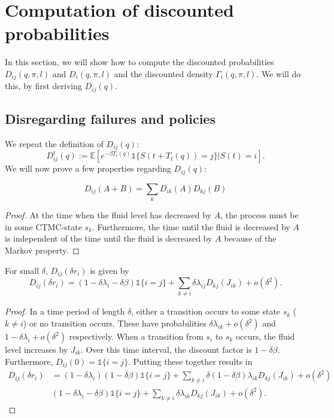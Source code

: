 \section{Computation of discounted probabilities}
In this section, we will show how to compute the discounted probabilities $D_{ij}(q,\pi,l)$ and $D_{i}(q,\pi,l)$ and the discounted density $\Gamma_i(q,\pi,l)$.
We will do this, by first deriving $D_{ij}(q)$.

\subsection{Disregarding failures and policies}
We repeat the definition of $D_{ij}(q)$:
\[
D_{ij}^t(q):=\mathbb{E}[e^{-\beta T_t(q)}\mathds{1}\{S(t+T_t(q))=j\}|S(t)=i].
\]
We will now prove a few properties regarding $D_{ij}(q)$:
\begin{lemma}\label{lemma:MmfmDiscountsExponentLinear}
	\[
	D_{ij}(A+B)=\sum\limits_k D_{ik}(A)D_{kj}(B)
	\]
	\begin{proof}
		At the time when the fluid level has decreased by $A$, the process must be in some CTMC-state $s_k$.
		Furthermore, the time until the fluid is decreased by $A$ is independent of the time until the fluid is decreased by $A$ because of the Markov property.
	\end{proof}
\end{lemma}
\begin{lemma}\label{lemma:MmfmDiscountsInfinitisimal}
	For small $\delta$, $D_{ij}(\delta r_i)$ is given by
	\[
	D_{ij}(\delta r_i)=(1-\delta\lambda_i-\delta\beta)\mathds{1}\{i=j\}+\sum\limits_{k\neq i}\delta\lambda_{ij}D_{kj}(J_{ik})+o(\delta^2).
	\]
	\begin{proof}
		In a time period of length $\delta$, either a transition occurs to some state $s_k$ ($k\neq i$) or no transition occurs.
		These have probabilities $\delta\lambda_{ik}+o(\delta^2)$ and $1-\delta\lambda_i+o(\delta^2)$ respectively.
		When a transition from $s_i$ to $s_k$ occurs, the fluid level increases by $J_{ik}$.
		Over this time interval, the discount factor is $1-\delta\beta$.
		Furthermore, $D_{ij}(0)=\mathds{1}\{i=j\}$.
		Putting these together results in
		\[
		\begin{split}
		D_{ij}(\delta r_i)&=(1-\delta\lambda_i)(1-\delta\beta)\mathds{1}\{i=j\}+\sum\limits_{k\neq i}\delta(1-\delta\beta)\lambda_{ik}D_{kj}(J_{ik})+o(\delta^2)\\
		&(1-\delta\lambda_i-\delta\beta)\mathds{1}\{i=j\}+\sum\limits_{k\neq i}\delta\lambda_{ik}D_{kj}(J_{ik})+o(\delta^2).
		\end{split}
		\]
	\end{proof}
\end{lemma}
